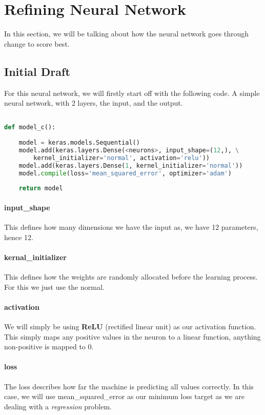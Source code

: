 

\section{Refining Neural Network}

In this section, we will be talking about how the neural network goes through change to score best.

\subsection{Initial Draft}

For this neural network, we will firstly start off with the following code. A simple neural network, with 2 layers, the input, and the output.

\begin{lstlisting}[language=Python]

def model_c():
    
    model = keras.models.Sequential()
    model.add(keras.layers.Dense(<neurons>, input_shape=(12,), \
		kernel_initializer='normal', activation='relu'))
    model.add(keras.layers.Dense(1, kernel_initializer='normal'))
    model.compile(loss='mean_squared_error', optimizer='adam')
   
    return model

\end{lstlisting}

\paragraph{input\_shape} This defines how many dimensions we have the input as, we have 12 parameters, hence 12.

\paragraph{kernal\_initializer} This defines how the weights are randomly allocated before the learning process. For this we just use the normal.

\paragraph{activation} We will simply be using \textbf{ReLU} (rectified linear unit) as our activation function. This simply maps any positive values in the neuron to a linear function, anything non-positive is mapped to 0.

\paragraph{loss} The loss describes how far the machine is predicting all values correctly. In this case, we will use mean\_squared\_error as our minimum loss target as we are dealing with a \textit{regression} problem.

